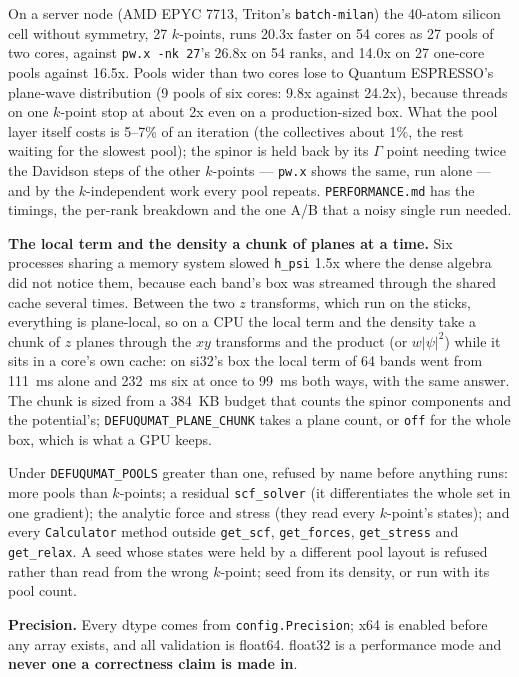 \documentclass[11pt,a4paper]{article}
\newcommand{\qe}{Quantum ESPRESSO}
\newcommand{\code}[1]{\texttt{\small #1}}
\begin{document}
\noindent On a server node (AMD EPYC 7713, Triton's \code{batch-milan}) the
40-atom silicon cell without symmetry, 27 $k$-points, runs 20.3x faster on 54
cores as 27 pools of two cores, against \code{pw.x -nk 27}'s 26.8x on 54 ranks,
and 14.0x on 27 one-core pools against 16.5x. Pools wider than two cores lose
to \qe's plane-wave distribution (9 pools of six cores: 9.8x against 24.2x),
because threads on one $k$-point stop at about 2x even on a production-sized
box. What the pool layer itself costs is 5--7\% of an iteration (the
collectives about 1\%, the rest waiting for the slowest pool); the spinor is held
back by its $\Gamma$ point needing twice the Davidson steps of the other
$k$-points --- \code{pw.x} shows the same, run alone --- and by the
$k$-independent work every pool repeats. \code{PERFORMANCE.md} has the timings,
the per-rank breakdown and the one A/B that a noisy single run needed.

\textbf{The local term and the density a chunk of planes at a time.} Six processes
sharing a memory system slowed \code{h\_psi} 1.5x where the dense algebra did not
notice them, because each band's box was streamed through the shared cache
several times. Between the two $z$ transforms, which run on the sticks,
everything is plane-local, so on a CPU the local term and the density take a
chunk of $z$ planes through the $xy$ transforms and the product (or
$w|\psi|^2$) while it sits in a core's own cache: on si32's box the local term of
64 bands went from 111~ms alone and 232~ms six at once to 99~ms both ways, with
the same answer. The chunk is sized from a 384~KB budget that counts the spinor
components and the potential's; \code{DEFUQUMAT\_PLANE\_CHUNK} takes a plane count,
or \code{off} for the whole box, which is what a GPU keeps.

\begin{refuses}
Under \code{DEFUQUMAT\_POOLS} greater than one, refused by name before anything
runs: more pools than $k$-points; a residual \code{scf\_solver} (it
differentiates the whole set in one gradient); the analytic force and stress
(they read every $k$-point's states); and every \code{Calculator} method outside
\code{get\_scf}, \code{get\_forces}, \code{get\_stress} and \code{get\_relax}.
A seed whose states were held by a different pool layout is refused rather than
read from the wrong $k$-point; seed from its density, or run with its pool count.
\end{refuses}

\textbf{Precision.} Every dtype comes from \code{config.Precision}; x64 is
enabled before any array exists, and all validation is float64. float32 is a
performance mode and \textbf{never one a correctness claim is made in}.
\end{document}
